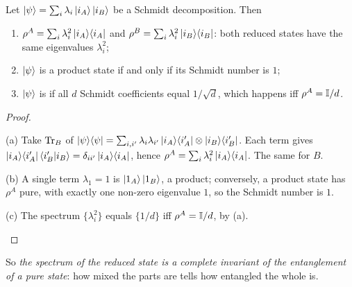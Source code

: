 \begin{corollary}\label{cor:schmidt}
  Let $\left|\psi\right\rangle=\sum_i\lambda_i\left|i_A\right\rangle\left|i_B\right\rangle$ be a Schmidt decomposition. Then
  \begin{enumerate}
    \item[(a)] $\rho^A=\sum_i\lambda_i^2\left|i_A\right\rangle\!\left\langle i_A\right|$ and $\rho^B=\sum_i\lambda_i^2\left|i_B\right\rangle\!\left\langle i_B\right|$: both reduced states have the same eigenvalues $\lambda_i^2$;
    \item[(b)] $\left|\psi\right\rangle$ is a product state if and only if its Schmidt number is $1$;
    \item[(c)] $\left|\psi\right\rangle$ is  if all $d$ Schmidt coefficients equal $1/\sqrt d$, which happens iff $\rho^A=\mathbb{I}/d$.
  \end{enumerate}
\end{corollary}
\begin{proof}
  \begin{steps}
    \item (a) Take $\operatorname{Tr}_B$ of $\left|\psi\right\rangle\!\left\langle\psi\right|=\sum_{i,i'}\lambda_i\lambda_{i'}\left|i_A\right\rangle\!\left\langle i'_A\right|\otimes\left|i_B\right\rangle\!\left\langle i'_B\right|$. Each term gives $\left|i_A\right\rangle\!\left\langle i'_A\right|\left\langle i'_B\middle|i_B\right\rangle=\delta_{ii'}\left|i_A\right\rangle\!\left\langle i_A\right|$, hence $\rho^A=\sum_i\lambda_i^2\left|i_A\right\rangle\!\left\langle i_A\right|$. The same for $B$.
    \item (b) A single term $\lambda_1=1$ is $\left|1_A\right\rangle\left|1_B\right\rangle$, a product; conversely, a product state has $\rho^A$ pure, with exactly one non-zero eigenvalue $1$, so the Schmidt number is $1$.
    \item (c) The spectrum $\{\lambda_i^2\}$ equals $\{1/d\}$ iff $\rho^A=\mathbb{I}/d$, by (a). \qedhere
  \end{steps}
\end{proof}

So \emph{the spectrum of the reduced state is a complete invariant of the entanglement of a pure state}: how mixed the parts are tells how entangled the whole is.

